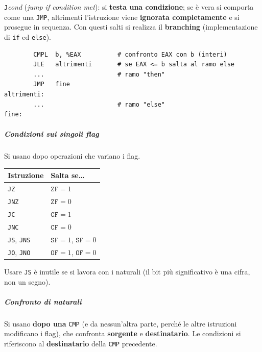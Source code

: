\documentclass[11pt,a4paper]{article}
\begin{document}
\texttt{J}\emph{cond} (\emph{jump if condition met}): si \textbf{testa una condizione}; se è vera si comporta come una \texttt{JMP}, altrimenti l'istruzione viene \textbf{ignorata completamente} e si prosegue in sequenza. Con questi salti si realizza il \textbf{branching} (implementazione di \texttt{if} ed \texttt{else}).

\begin{integrazione}
\begin{lstlisting}
        CMPL  b, %EAX          # confronto EAX con b (interi)
        JLE   altrimenti       # se EAX <= b salta al ramo else
        ...                    # ramo "then"
        JMP   fine
altrimenti:
        ...                    # ramo "else"
fine:
\end{lstlisting}
\end{integrazione}

\subparagraph*{Condizioni sui singoli flag}

Si usano dopo operazioni che variano i flag.

\begin{center}
\begin{tabular}{l l}
\textbf{Istruzione} & \textbf{Salta se\ldots} \\ \hline
\texttt{JZ}  & $\texttt{ZF}=1$ \\
\texttt{JNZ} & $\texttt{ZF}=0$ \\
\texttt{JC}  & $\texttt{CF}=1$ \\
\texttt{JNC} & $\texttt{CF}=0$ \\
\texttt{JS}, \texttt{JNS} & $\texttt{SF}=1$, $\texttt{SF}=0$ \\
\texttt{JO}, \texttt{JNO} & $\texttt{OF}=1$, $\texttt{OF}=0$ \\
\end{tabular}
\end{center}

\begin{nota}
Usare \texttt{JS} è inutile se si lavora con i naturali (il bit più significativo è una cifra, non un segno).
\end{nota}

\subparagraph*{Confronto di naturali}

Si usano \textbf{dopo una} \texttt{CMP} (e da nessun'altra parte, perché le altre istruzioni modificano i flag), che confronta \textbf{sorgente} e \textbf{destinatario}. Le condizioni si riferiscono al \textbf{destinatario} della \texttt{CMP} precedente.
\end{document}
